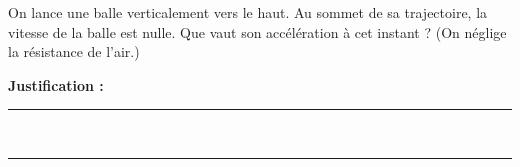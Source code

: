 On lance une balle verticalement vers le haut. Au sommet de sa trajectoire, la vitesse de la balle est nulle. Que vaut son accélération à cet instant ? (On néglige la résistance de l'air.)

\choices

\noindent\textbf{Justification :} \hrulefill \\[2.5ex]
\rule{\linewidth}{0.4pt} \\[2.5ex]
\rule{\linewidth}{0.4pt}
\vfill
